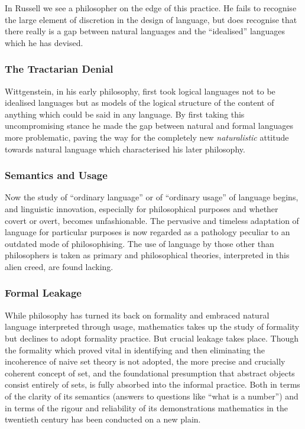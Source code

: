 In Russell we see a philosopher on the edge of this practice.
He fails to recognise the large element of discretion in the design of language, but does recognise that there really is a gap between natural languages and the ``idealised'' languages which he has devised.

\subsubsection{The Tractarian Denial}

Wittgenstein, in his early philosophy, first took logical languages not to be idealised languages but as models of the logical structure of the content of anything which could be said in any language.
By first taking this uncompromising stance he made the gap between natural and formal languages more problematic, paving the way for the completely new {\it naturalistic} attitude towards natural language which characterised his later philosophy.

\subsubsection{Semantics and Usage}

Now the study of ``ordinary language'' or of ``ordinary usage'' of language begins, and linguistic innovation, especially for philosophical purposes and whether covert or overt, becomes unfashionable.
The pervasive and timeless adaptation of language for particular purposes is now regarded as a pathology peculiar to an outdated mode of philosophising.
The use of language by those other than philosophers is taken as primary and philosophical theories, interpreted in this alien creed, are found lacking.

\subsubsection{Formal Leakage}

While philosophy has turned its back on formality and embraced natural language interpreted through usage, mathematics takes up the study of formality but declines to adopt formality practice.
But crucial leakage takes place.
Though the formality which proved vital in identifying and then eliminating the incoherence of naive set theory is not adopted, the more precise and crucially coherent concept of set, and the foundational presumption that abstract objects consist entirely of sets, is fully absorbed into the informal practice.
Both in terms of the clarity of its semantics (answers to questions like ``what is a number'') and in terms of the rigour and reliability of its demonstrations mathematics in the twentieth century has been conducted on a new plain.

